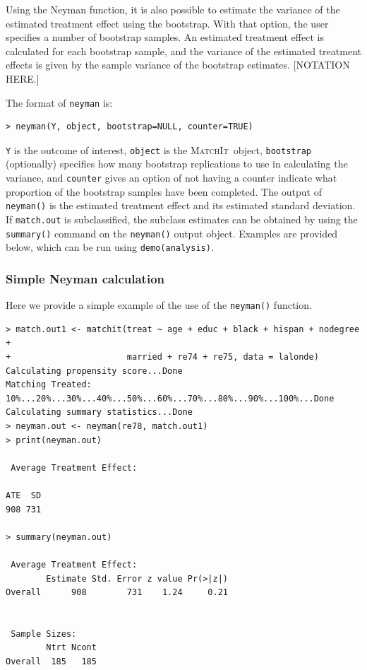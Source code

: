 \documentclass[oneside,letterpaper,titlepage]{article}
\newcommand{\MatchIt}{\textsc{MatchIt}}
\begin{document}
Using the Neyman function, it is also possible to estimate the variance of the estimated treatment effect using the bootstrap.  With that option,
the user specifies a number of bootstrap samples.  An estimated treatment effect is calculated for each bootstrap sample, and the variance of the estimated
treatment effects is given by the sample variance of the bootstrap estimates.  [NOTATION HERE.]  

The format of {\tt neyman} is:

\begin{verbatim}
> neyman(Y, object, bootstrap=NULL, counter=TRUE)
\end{verbatim}

{\tt Y} is the outcome of interest, {\tt object} is the \MatchIt\ object, {\tt bootstrap} (optionally) 
specifies how many bootstrap replications to use in calculating the variance, and {\tt counter} gives an option of not having a counter indicate
what proportion of the bootstrap samples have been completed.  The output of {\tt neyman()} is the estimated treatment effect and its
estimated standard deviation.   If {\tt match.out} is subclassified, the subclass estimates can be obtained by using the {\tt summary()} command on the
{\tt neyman()} output object.  Examples are provided below, which can be run using {\tt demo(analysis)}.

\subsubsection{Simple Neyman calculation}
Here we provide a simple example of the use of the {\tt neyman()} function.

\begin{verbatim}
> match.out1 <- matchit(treat ~ age + educ + black + hispan + nodegree +
+                       married + re74 + re75, data = lalonde)
Calculating propensity score...Done
Matching Treated: 10%...20%...30%...40%...50%...60%...70%...80%...90%...100%...Done
Calculating summary statistics...Done
> neyman.out <- neyman(re78, match.out1)
> print(neyman.out)
 
 Average Treatment Effect:
  
ATE  SD
908 731
 
> summary(neyman.out)
 
 Average Treatment Effect:
        Estimate Std. Error z value Pr(>|z|)
Overall      908        731    1.24     0.21
 
 
 Sample Sizes:
        Ntrt Ncont
Overall  185   185
\end{verbatim}
\end{document}
